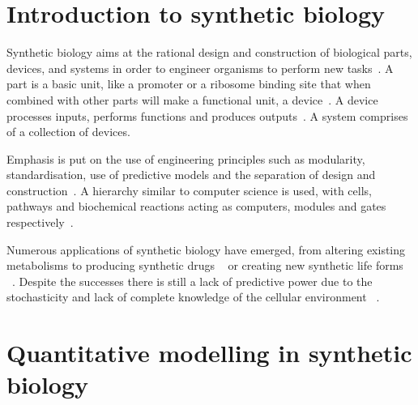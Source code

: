 

\section{Introduction to synthetic biology}

Synthetic biology aims at the rational design and construction of biological parts, devices, and systems in order to engineer organisms to perform new tasks~\autocite{Lu:2009ez, Andrianantoandro:2006bia}. A part is a basic unit, like a promoter or a ribosome binding site that when combined with other parts will make a functional unit, a device~\autocite{Heinemann:2006ht}. A device processes inputs, performs functions and produces outputs~\autocite{Andrianantoandro:2006bia}. A system comprises of a collection of devices.     

Emphasis is put on the use of engineering principles such as modularity, standardisation, use of predictive models and the separation of design and construction~\autocite{Agapakis:2009bt, Heinemann:2006ht}. A hierarchy similar to computer science is used, with cells, pathways and biochemical reactions acting as computers, modules and gates respectively~\autocite{Andrianantoandro:2006bia}. 
       
Numerous applications of synthetic biology have emerged, from altering existing metabolisms to producing synthetic drugs ~\autocite{Holtz:2010bm} or creating new synthetic life forms ~\autocite{Agapakis:2009bt}. Despite the successes there is still a lack of predictive power due to the stochasticity and lack of complete knowledge of the cellular environment ~\autocite{Andrianantoandro:2006bia}.



\section{Quantitative modelling in synthetic biology}




